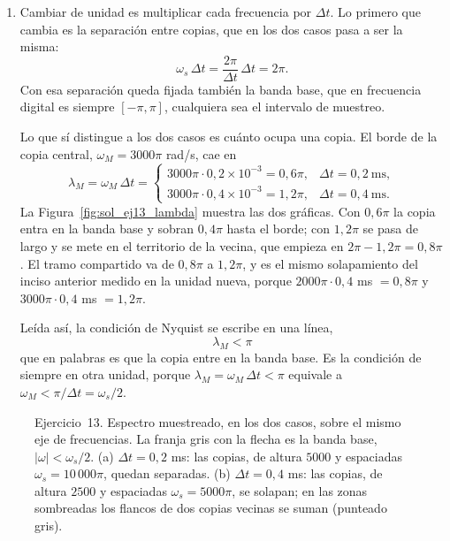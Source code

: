 \documentclass[10pt,a4paper]{article}
\begin{document}
\begin{enumerate}
		\item Cambiar de unidad es
		multiplicar cada frecuencia por $\Delta t$. Lo primero que cambia es la separación entre
		copias, que en los dos casos pasa a ser la misma:
		\[
			\omega_s\,\Delta t = \frac{2\pi}{\Delta t}\,\Delta t = 2\pi .
		\]
		Con esa separación queda fijada también la banda base, que en frecuencia digital es
		siempre $[-\pi,\pi]$, cualquiera sea el intervalo de muestreo.

		Lo que sí distingue a los dos casos es cuánto ocupa una copia. El borde de la copia
		central, $\omega_M = 3000\pi$ rad/s, cae en
		\[
			\lambda_M = \omega_M\,\Delta t =
			\begin{cases}
				3000\pi\cdot 0{,}2\times10^{-3} = 0{,}6\pi, & \Delta t = 0{,}2\ \text{ms},\\[4pt]
				3000\pi\cdot 0{,}4\times10^{-3} = 1{,}2\pi, & \Delta t = 0{,}4\ \text{ms}.
			\end{cases}
		\]
		La Figura~\ref{fig:sol_ej13_lambda} muestra las dos gráficas. Con $0{,}6\pi$ la copia
		entra en la banda base y sobran $0{,}4\pi$ hasta el borde; con $1{,}2\pi$ se pasa de
		largo y se mete en el territorio de la vecina, que empieza en $2\pi - 1{,}2\pi =
		0{,}8\pi$. El tramo compartido va de $0{,}8\pi$ a $1{,}2\pi$, y es el mismo solapamiento
		del inciso anterior medido en la unidad nueva, porque $2000\pi\cdot0{,}4$ ms $=0{,}8\pi$
		y $3000\pi\cdot0{,}4$ ms $=1{,}2\pi$.

		Leída así, la condición de Nyquist se escribe en una línea,
		\[
			\boxed{\;\lambda_M < \pi\;}
		\]
		que en palabras es que la copia entre en la banda base. Es la condición de siempre en
		otra unidad, porque $\lambda_M = \omega_M\,\Delta t < \pi$ equivale a
		$\omega_M < \pi/\Delta t = \omega_s/2$.
	\end{enumerate}

	\begin{figure}[H]
		\centering
		
		\caption{Ejercicio~13. Espectro muestreado, en los dos casos, sobre el mismo
		eje de frecuencias. La franja gris con la flecha es la banda base,
		$|\omega|<\omega_s/2$. (a) $\Delta t = 0{,}2$ ms: las copias, de altura $5000$ y
		espaciadas $\omega_s = 10\,000\pi$, quedan separadas. (b) $\Delta t = 0{,}4$
		ms: las copias, de altura $2500$ y espaciadas $\omega_s = 5000\pi$, se
		solapan; en las zonas sombreadas los flancos de dos copias vecinas se suman
		(punteado gris).}
		\label{fig:sol_ej13}
	\end{figure}
\end{document}
